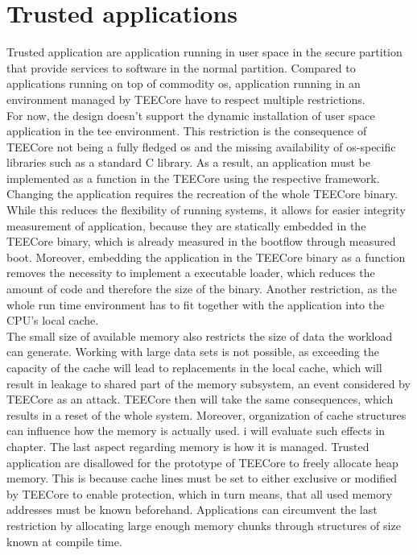 \section{Trusted applications}
Trusted application are application running in user space in the secure
partition that provide services to software in the normal partition. Compared to
applications running on top of commodity \gls{os}, application running in
an environment managed by TEECore have to respect multiple restrictions.\\

For now, the design doesn't support the dynamic installation of user space
application in the \gls{tee} environment. This restriction is the consequence of
TEECore not being a fully fledged \gls{os} and the missing availability of
\gls{os}-specific libraries such as a standard C library. As a result, an
application must be implemented as a function in the TEECore using the
respective framework. Changing the application requires the recreation of the
whole TEECore binary. While this reduces the flexibility of running systems, it
allows for easier integrity measurement of application, because they are
statically embedded in the TEECore binary, which is already measured in the
bootflow through measured boot. Moreover, embedding the application in the
TEECore binary as a function removes the necessity to implement a executable
loader, which reduces the amount of code and therefore the size of the binary.
Another restriction, as the whole run time environment has to fit together with
the application into the CPU's local cache.\\

The small size of available memory also restricts the size of data the workload
can generate. Working with large data sets is not possible, as exceeding the
capacity of the cache will lead to replacements in the local cache, which will
result in leakage to shared part of the memory subsystem, an event considered by
TEECore as an attack. TEECore then will take the same consequences, which
results in a reset of the whole system. Moreover, organization of cache
structures can influence how the memory is actually used. i will evaluate such
effects in chapter. The last aspect regarding
memory is how it is managed. Trusted application are disallowed for the
prototype of TEECore to freely allocate heap memory. This is because cache lines
must be set to either exclusive or modified by TEECore to enable protection,
which in turn means, that all used memory addresses must be known beforehand.
Applications can circumvent the last restriction by allocating large enough
memory chunks through structures of size known at compile time.\\

